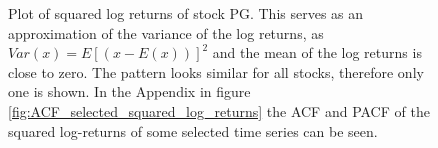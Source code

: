 \begin{figure}[h]
    \centering
    \begin{adjustbox}{width=.95\textwidth,center}
    
    \end{adjustbox}  
    \caption{Plot of squared log returns of stock PG. This serves as an approximation of the variance of the log returns, as $Var(x) = E [(x - E(x))]^2$ and the mean of the log returns is close to zero. The pattern looks similar for all stocks, therefore only one is shown. In the Appendix in figure \ref{fig:ACF_selected_squared_log_returns} the ACF and PACF of the squared log-returns of some selected time series can be seen.}
    \label{fig:PG_squared_log_returns}
\end{figure}{}



